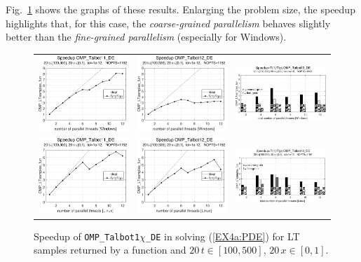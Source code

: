 \documentclass[a4paper,10pt]{report}%
\begin{document}
Fig.~\ref{PAR_EX4a_speedup_fun2} shows the graphs of these results. Enlarging the problem size, the speedup
highlights that, for this case, the {\em coarse-grained parallelism} behaves slightly better than the
{\em fine-grained parallelism} (especially for Windows).
\begin{figure}[htb]
\centering
\begin{tabular}{ccc} %
\includegraphics[height=0.2\textwidth]{./FIGS/EX4a/EX4a_fun_speedup_11_20t_100_Windows.eps} &
\includegraphics[height=0.2\textwidth]{./FIGS/EX4a/EX4a_fun_speedup_12_20t_100_Windows.eps} &
\includegraphics[height=0.2\textwidth,keepaspectratio=true]{./FIGS/EX4a/EX4a_fun_speedup_13_20t_100_Windows.eps} \\
\includegraphics[height=0.2\textwidth]{./FIGS/EX4a/EX4a_fun_speedup_11_20t_100_Linux.eps} &
\includegraphics[height=0.2\textwidth]{./FIGS/EX4a/EX4a_fun_speedup_12_20t_100_Linux.eps} &
\includegraphics[height=0.2\textwidth,keepaspectratio=true]{./FIGS/EX4a/EX4a_fun_speedup_13_20t_100_Linux.eps}
\end{tabular}
\caption{\small Speedup of {\tt OMP\_Talbot1$\chi$\_DE} in solving (\ref{EX4a:PDE}) for LT samples
returned by a function and $20\,t\in[100,500]$, $20\,x\in[0,1]$.}
\label{PAR_EX4a_speedup_fun2}
\end{figure}
\end{document}
